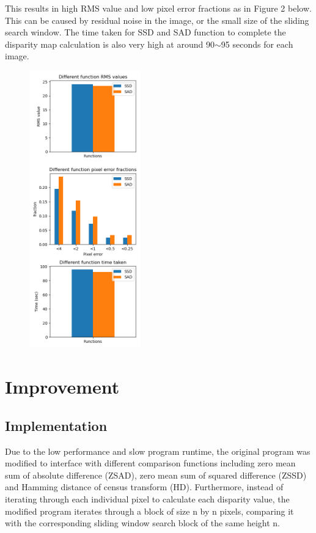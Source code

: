\documentclass[conference]{IEEEtran}
\begin{document}
This results in high RMS value and low pixel error fractions as in Figure 2 below. This can be caused by residual noise in the image, or the small size of the sliding search window. The time taken for SSD and SAD function to complete the disparity map calculation is also very high at around 90\(\sim \)95 seconds for each image.

\begin{figure}[H]
    \centering
    \includegraphics[height=12cm]{702_stats_1_25.png}
\end{figure}

\section{Improvement}

\subsection{Implementation}

Due to the low performance and slow program runtime, the original program was modified to interface with different comparison functions including zero mean sum of absolute difference (ZSAD), zero mean sum of squared difference (ZSSD) and Hamming distance of census transform (HD). Furthermore, instead of iterating through each individual pixel to calculate each disparity value, the modified program iterates through a block of size n by n pixels, comparing it with the corresponding sliding window search block of the same height n. 
\end{document}
